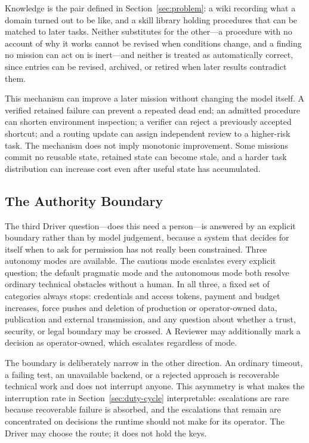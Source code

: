 Knowledge is the pair defined in Section~\ref{sec:problem}: a wiki recording what a
domain turned out to be like, and a skill library holding procedures that can be
matched to later tasks. Neither substitutes for the other---a procedure with no
account of why it works cannot be revised when conditions change, and a finding no
mission can act on is inert---and neither is treated as automatically correct, since
entries can be revised, archived, or retired when later results contradict them.

This mechanism can improve a later mission without changing the model itself. A
verified retained failure can prevent a repeated dead end; an admitted procedure can shorten
environment inspection; a verifier can reject a previously accepted shortcut; and
a routing update can assign independent review to a higher-risk task. The mechanism
does not imply monotonic improvement. Some missions commit no reusable state,
retained state can become stale, and a harder task distribution can increase cost
even after useful state has accumulated.

\subsection{The Authority Boundary}

The third Driver question---does this need a person---is answered by an explicit
boundary rather than by model judgement, because a system that decides for itself
when to ask for permission has not really been constrained. Three autonomy modes are
available. The cautious mode escalates every explicit question; the default
pragmatic mode and the autonomous mode both resolve ordinary technical obstacles
without a human. In all three, a fixed set of categories always stops: credentials
and access tokens, payment and budget increases, force pushes and deletion of
production or operator-owned data, publication and external transmission, and any
question about whether a trust, security, or legal boundary may be crossed. A
Reviewer may additionally mark a decision as operator-owned, which escalates
regardless of mode.

The boundary is deliberately narrow in the other direction. An ordinary timeout, a
failing test, an unavailable backend, or a rejected approach is recoverable technical
work and does not interrupt anyone. This asymmetry is what makes the interruption
rate in Section~\ref{sec:duty-cycle} interpretable: escalations are rare because
recoverable failure is absorbed, and the escalations that remain are concentrated on
decisions the runtime should not make for its operator. The Driver may choose the
route; it does not hold the keys.

